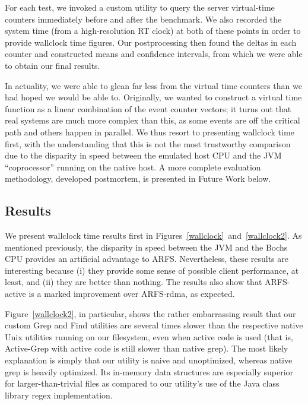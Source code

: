 \documentclass[10pt]{article}
\begin{document}
For each test, we invoked a custom utility to query the server
virtual-time counters immediately before and after the benchmark. We
also recorded the system time (from a high-resolution RT clock) at
both of these points in order to provide wallclock time figures. Our
postprocessing then found the deltas in each counter and constructed
means and confidence intervals, from which we were able to obtain our
final results.

In actuality, we were able to glean far less from the virtual time
counters than we had hoped we would be able to. Originally, we wanted
to construct a virtual time function as a linear combination of the
event counter vectors; it turns out that real systems are much more
complex than this, as some events are off the critical path and others
happen in parallel. We thus resort to presenting wallclock time first,
with the understanding that this is not the most trustworthy
comparison due to the disparity in speed between the emulated host CPU
and the JVM ``coprocessor'' running on the native host. A more
complete evaluation methodology, developed postmortem, is presented in
Future Work below.

\subsection{Results}

We present wallclock time results first in
Figures~\ref{wallclock}~and~\ref{wallclock2}. As mentioned previously,
the disparity in speed between the JVM and the Bochs CPU provides an
artificial advantage to ARFS. Nevertheless, these results are
interesting because (i) they provide some sense of possible client
performance, at least, and (ii) they are better than nothing. The
results also show that ARFS-active is a marked improvement over
ARFS-rdma, as expected.

Figure~\ref{wallclock2}, in particular, shows the rather embarrassing
result that our custom Grep and Find utilities are several times
slower than the respective native Unix utilities running on our
filesystem, even when active code is used (that is, Active-Grep with
active code is still slower than native grep). The most likely
explanation is simply that our utility is naive and unoptimized,
whereas native grep is heavily optimized. Its in-memory data
structures are especially superior for larger-than-trivial files as
compared to our utility's use of the Java class library regex
implementation.
\end{document}

